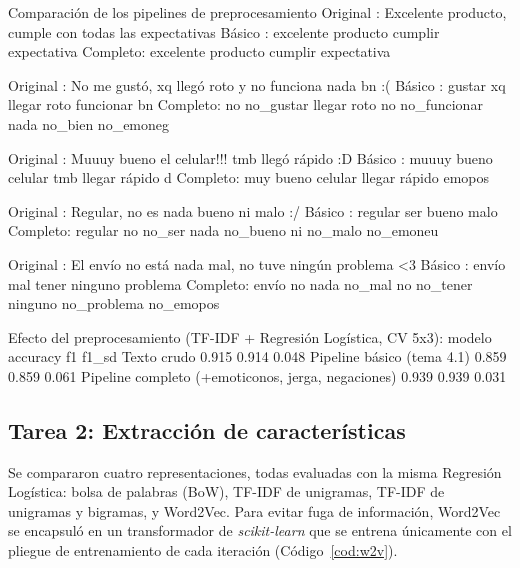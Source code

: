 \documentclass[11pt,letterpaper]{article}
\begin{document}
\begin{consola}[label=out:prep]{Comparación de los pipelines de preprocesamiento}
Original : Excelente producto, cumple con todas las expectativas
  Básico  : excelente producto cumplir expectativa
  Completo: excelente producto cumplir expectativa

Original : No me gustó, xq llegó roto y no funciona nada bn :(
  Básico  : gustar xq llegar roto funcionar bn
  Completo: no no_gustar llegar roto no no_funcionar nada no_bien no_emoneg

Original : Muuuy bueno el celular!!! tmb llegó rápido :D
  Básico  : muuuy bueno celular tmb llegar rápido d
  Completo: muy bueno celular llegar rápido emopos

Original : Regular, no es nada bueno ni malo :/
  Básico  : regular ser bueno malo
  Completo: regular no no_ser nada no_bueno ni no_malo no_emoneu

Original : El envío no está nada mal, no tuve ningún problema <3
  Básico  : envío mal tener ninguno problema
  Completo: envío no nada no_mal no no_tener ninguno no_problema no_emopos

Efecto del preprocesamiento (TF-IDF + Regresión Logística, CV 5x3):
                                            modelo  accuracy    f1  f1_sd
                                       Texto crudo     0.915 0.914  0.048
                        Pipeline básico (tema 4.1)     0.859 0.859  0.061
Pipeline completo (+emoticonos, jerga, negaciones)     0.939 0.939  0.031
\end{consola}

\subsection{Tarea 2: Extracción de características}

Se compararon cuatro representaciones, todas evaluadas con la misma Regresión Logística: bolsa de palabras (BoW), TF-IDF de unigramas, TF-IDF de unigramas y bigramas, y Word2Vec. Para evitar fuga de información, Word2Vec se encapsuló en un transformador de \textit{scikit-learn} que se entrena únicamente con el pliegue de entrenamiento de cada iteración (Código~\ref{cod:w2v}).
\end{document}
